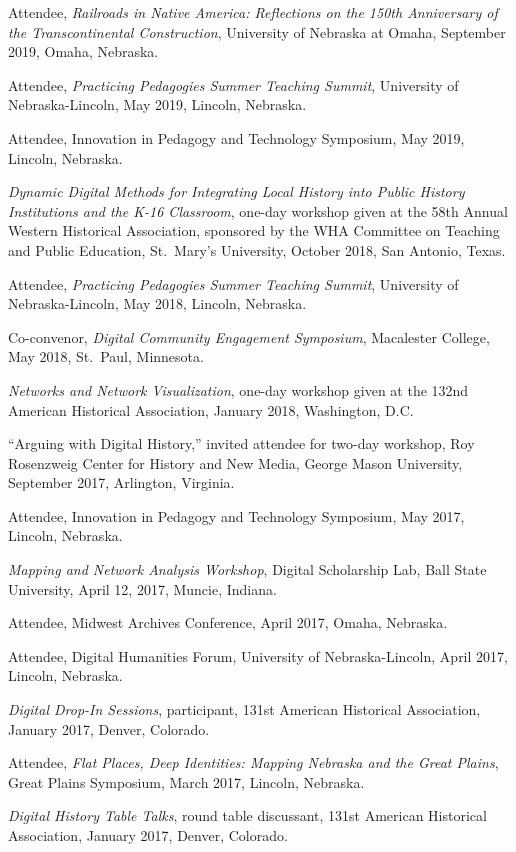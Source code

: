 Attendee, \emph{Railroads in Native America: Reflections on the 150th
Anniversary of the Transcontinental Construction}, University of
Nebraska at Omaha, September 2019, Omaha, Nebraska.

Attendee, \emph{Practicing Pedagogies Summer Teaching Summit},
University of Nebraska-Lincoln, May 2019, Lincoln, Nebraska.

Attendee, Innovation in Pedagogy and Technology Symposium, May 2019,
Lincoln, Nebraska.

\emph{Dynamic Digital Methods for Integrating Local History into Public
History Institutions and the K-16 Classroom}, one-day workshop given at
the 58th Annual Western Historical Association, sponsored by the WHA
Committee on Teaching and Public Education, St.~Mary's University,
October 2018, San Antonio, Texas.

Attendee, \emph{Practicing Pedagogies Summer Teaching Summit},
University of Nebraska-Lincoln, May 2018, Lincoln, Nebraska.

Co-convenor, \emph{Digital Community Engagement Symposium}, Macalester
College, May 2018, St.~Paul, Minnesota.

\emph{Networks and Network Visualization}, one-day workshop given at the
132nd American Historical Association, January 2018, Washington, D.C.

``Arguing with Digital History,'' invited attendee for two-day workshop,
Roy Rosenzweig Center for History and New Media, George Mason
University, September 2017, Arlington, Virginia.

Attendee, Innovation in Pedagogy and Technology Symposium, May 2017,
Lincoln, Nebraska.

\emph{Mapping and Network Analysis Workshop}, Digital Scholarship Lab,
Ball State University, April 12, 2017, Muncie, Indiana.

Attendee, Midwest Archives Conference, April 2017, Omaha, Nebraska.

Attendee, Digital Humanities Forum, University of Nebraska-Lincoln,
April 2017, Lincoln, Nebraska.

\emph{Digital Drop-In Sessions}, participant, 131st American Historical
Association, January 2017, Denver, Colorado.

Attendee, \emph{Flat Places, Deep Identities: Mapping Nebraska and the
Great Plains}, Great Plains Symposium, March 2017, Lincoln, Nebraska.

\emph{Digital History Table Talks}, round table discussant, 131st
American Historical Association, January 2017, Denver, Colorado.

